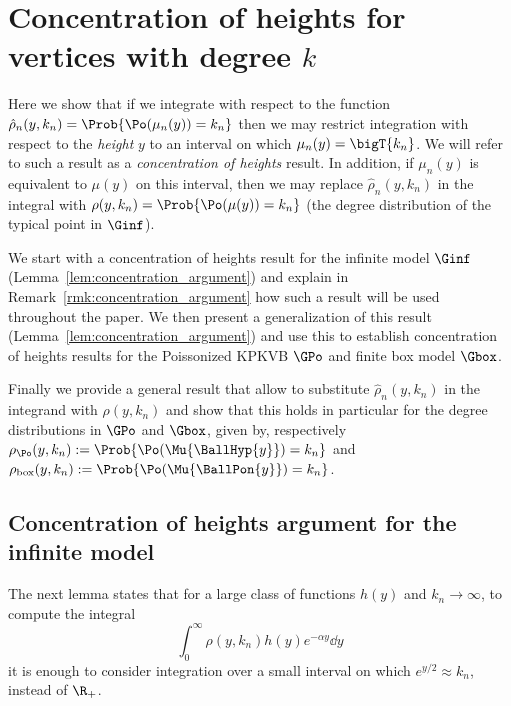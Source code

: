 \section{Concentration of heights for vertices with degree $k$}\label{sec:concentration_argument}

Here we show that if we integrate with respect to the function $\hat{\rho}_n(y,k_n) = \Prob{\Po(\mu_n(y)) = k_n}$ then we may restrict integration with respect to the \emph{height} $y$ to an interval on which $\mu_n(y) = \bigT{k_n}$. We will refer to such a result as a \emph{concentration of heights} result. In addition, if $\mu_n(y)$ is equivalent to $\mu(y)$ on this interval, then we may replace $\hat{\rho}_n(y,k_n)$ in the integral with $\rho(y,k_n) = \Prob{\Po(\mu(y)) = k_n}$ (the degree distribution of the typical point in $\Ginf$). 

We start with a concentration of heights result for the infinite model $\Ginf$ (Lemma~\ref{lem:concentration_argument}) and explain in Remark~\ref{rmk:concentration_argument} how such a result will be used throughout the paper. We then present a generalization of this result (Lemma~\ref{lem:concentration_argument}) and use this to establish concentration of heights results for the Poissonized KPKVB $\GPo$ and finite box model $\Gbox$. 

Finally we provide a general result that allow to substitute $\hat{\rho}_n(y,k_n)$ in the integrand with $\rho(y,k_n)$ and show that this holds in particular for the degree distributions in $\GPo$ and $\Gbox$, given by, respectively $\rho_{\Po}(y,k_n) := \Prob{\Po(\Mu{\BallHyp{y}}) = k_n}$ and $\rho_{\text{box}}(y,k_n) := \Prob{\Po(\Mu{\BallPon{y}}) = k_n}$.

\subsection{Concentration of heights argument for the infinite model}

The next lemma states that for a large class of functions $h(y)$ and $k_n \to \infty$, to compute the integral 
\[
	\int_{0}^\infty \rho(y,k_n) h(y) e^{-\alpha y} \dd y
\]
it is enough to consider integration over a small interval on which $e^{y/2} \approx k_n$, instead of $\R_+$. 

